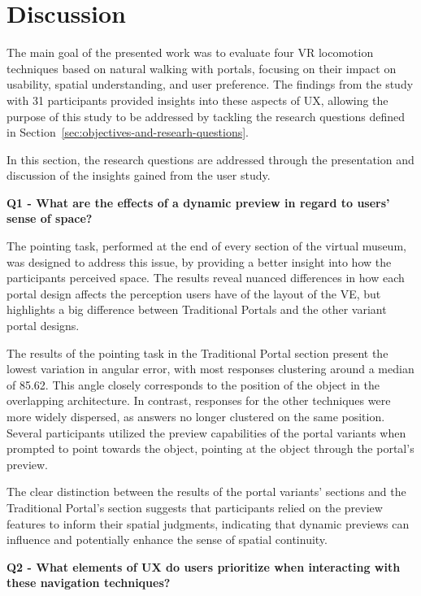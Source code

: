 \section{Discussion}
\label{sec:discussion}

The main goal of the presented work was to evaluate four \gls{VR} locomotion techniques based on natural walking with portals, 
focusing on their impact on usability, spatial understanding, and user preference. The findings from the study with 31 participants 
provided insights into these aspects of \gls{UX}, allowing the purpose of this study to be addressed by tackling the research questions 
defined in Section~\ref{sec:objectives-and-researh-questions}.

In this section, the research questions are addressed through the presentation and discussion of the insights gained from the user study.

\textbf{Q1 - What are the effects of a dynamic preview in regard to users' sense of space?}

The pointing task, performed at the end of every section of the virtual museum, was designed to address this issue, by providing a better 
insight into how the participants perceived space. The results reveal nuanced differences in how each portal design affects the perception 
users have of the layout of the \gls{VE}, but highlights a big difference between Traditional Portals and the other variant portal designs.

The results of the pointing task in the Traditional Portal section present the lowest variation in angular error, with most responses 
clustering around a median of 85.62\textdegree. This angle closely corresponds to the position of the object in the overlapping 
architecture. In contrast, responses for the other techniques were more widely dispersed, as answers no longer clustered on the same 
position. Several participants utilized the preview capabilities of the portal variants when prompted to point towards the object, pointing 
at the object through the portal's preview. 

The clear distinction between the results of the portal variants' sections and the Traditional Portal's section suggests that participants 
relied on the preview features to inform their spatial judgments, indicating that dynamic previews can influence and potentially enhance 
the sense of spatial continuity.


\textbf{Q2 - What elements of \gls{UX} do users prioritize when interacting with these navigation techniques?}

